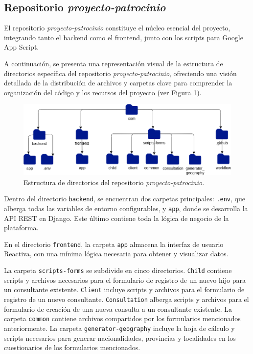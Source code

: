 \subsection{Repositorio \textit{proyecto-patrocinio}}

El repositorio \textit{proyecto-patrocinio} constituye el núcleo esencial del proyecto, integrando tanto el backend como el frontend, junto con los scripts para Google App Script.

A continuación, se presenta una representación visual de la estructura de directorios específica del repositorio \textit{proyecto-patrocinio}, ofreciendo una visión detallada de la distribución de archivos y carpetas clave para comprender la organización del código y los recursos del proyecto (ver Figura \ref{fig:unit-directory}).

\begin{figure}[h]
    \centering
    \includegraphics[width=1\linewidth]{fig/directory.png}
    \caption{Estructura de directorios del repositorio \textit{proyecto-patrocinio}.}
    \label{fig:unit-directory}
\end{figure}

Dentro del directorio \texttt{backend}, se encuentran dos carpetas principales: \texttt{.env}, que alberga todas las variables de entorno configurables, y \texttt{app}, donde se desarrolla la API REST en Django. Este último contiene toda la lógica de negocio de la plataforma.

En el directorio \texttt{frontend}, la carpeta \texttt{app} almacena la interfaz de usuario Reactiva, con una mínima lógica necesaria para obtener y visualizar datos.

La carpeta \texttt{scripts-forms} se subdivide en cinco directorios. \texttt{Child} contiene scripts y archivos necesarios para el formulario de registro de un nuevo hijo para un consultante existente. \texttt{Client} incluye scripts y archivos para el formulario de registro de un nuevo consultante. \texttt{Consultation} alberga scripts y archivos para el formulario de creación de una nueva consulta a un consultante existente. La carpeta \texttt{common} contiene archivos compartidos por los formularios mencionados anteriormente. La carpeta \texttt{generator-geography} incluye la hoja de cálculo y scripts necesarios para generar nacionalidades, provincias y localidades en los cuestionarios de los formularios mencionados.

